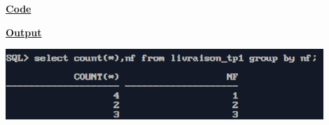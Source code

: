 \newpage
{}

\textbf{\underline{Code}}


\vspace{1cm}
\textbf{\underline{Output}}
\vspace{1cm}
\begin{center}
    \includegraphics[width=0.9\textwidth]{Questions/q30/q30.png}
\end{center}


